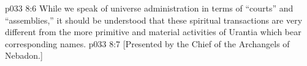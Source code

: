 \vs p033 8:6 While we speak of universe administration in terms of “courts” and “assemblies,” it should be understood that these spiritual transactions are very different from the more primitive and material activities of Urantia which bear corresponding names.
\vsetoff
\vs p033 8:7 [Presented by the Chief of the Archangels of Nebadon.]
\quizlink
